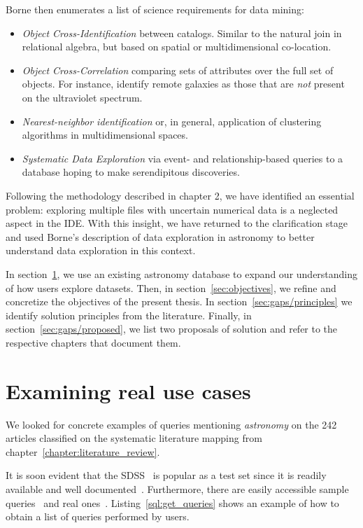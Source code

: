 Borne then enumerates a list of science requirements for data mining:

\begin{itemize}
    \item \emph{Object Cross-Identification} between catalogs. Similar to the natural join
        in relational algebra, but based on spatial or multidimensional co-location.
    \item \emph{Object Cross-Correlation} comparing sets of attributes over the full set of objects.
        For instance, identify remote galaxies as those that are \emph{not} present on
        the ultraviolet spectrum.
    \item \emph{Nearest-neighbor identification} or, in general, application of clustering
        algorithms in multidimensional spaces.
    \item \emph{Systematic Data Exploration} via event- and relationship-based queries to a database
        hoping to make serendipitous discoveries.
\end{itemize}

Following the methodology described in chapter 2, we have identified an essential problem:
exploring multiple files with uncertain numerical data is a neglected aspect in the \gls{IDE}.
With this insight, we have returned to the clarification stage and used Borne's description
of data exploration in astronomy to better understand data exploration in
this context.


In section~\ref{sec:real_use_cases}, we use an existing astronomy database
to expand our understanding of how users explore datasets. Then,
in section~\ref{sec:objectives}, we refine and concretize the objectives
of the present thesis. In section~\ref{sec:gaps/principles} we identify
solution principles from the literature. Finally, in
section~\ref{sec:gaps/proposed}, we list two proposals of solution and refer
to the respective chapters that document them.

\section{Examining real use cases}
\label{sec:real_use_cases}

We looked for concrete examples of queries mentioning \emph{astronomy} on the
242 articles classified on the systematic literature mapping from
chapter~\ref{chapter:literature_review}.

It is soon evident that the \gls{SDSS}~\cite{SDSS14} is popular as a test
set since it is readily available and well documented~\cite{Gray2002}.
Furthermore, there are easily accessible sample queries~\cite{SDSSSamples}
and real ones~\cite{SDSSSqlLogs}.
Listing~\ref{sql:get_queries} shows an example of how to obtain a list
of queries performed by users.

